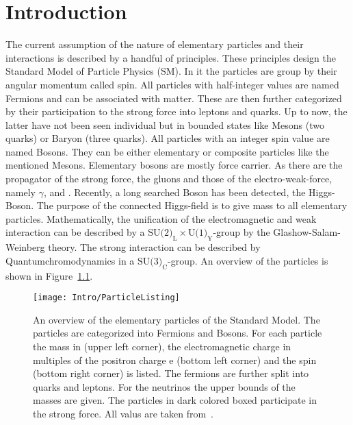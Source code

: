 \chapter{Introduction \label{sec:Intro}}

The current assumption of the nature of elementary particles and their interactions is described by a handful of principles. These principles design the Standard Model of Particle Physics (SM). In it the particles are group by their angular momentum called spin. All particles with half-integer values are named Fermions and can be associated with matter. These are then further categorized by their participation to the strong force into leptons and quarks. Up to now, the latter have not been seen individual but in bounded states like Mesons (two quarks) or Baryon (three quarks). All particles with an integer spin value are named Bosons. They can be either elementary or composite particles like the mentioned Mesons. Elementary bosons are mostly force carrier. As there are the propagator of the strong force, the gluons and those of the electro-weak-force, namely $\gamma{}$, \Zz{} and \Wpm{}. Recently, a long searched Boson has been detected, the Higgs-Boson. The purpose of the connected Higgs-field is to give mass to all elementary particles. Mathematically, the unification of the electromagnetic and weak interaction can be described by a $\textrm{SU(2)}_{\textrm{L}} \times \textrm{U(1)}_{\textrm{Y}}$-group by the Glashow-Salam-Weinberg theory. The strong interaction can be described by Quantumchromodynamics in a $\textrm{SU(3)}_{\textrm{C}}$-group. An overview of the particles is shown in Figure~\ref{plot:IntroParticles}.

\begin{figure}[!htb]
  \centering
  \texttt{[image: Intro/ParticleListing]}
  \caption[Overview over the elementary particles]{An overview of the elementary particles of the Standard Model. The particles are categorized into Fermions and Bosons. For each particle the mass in \MeV (upper left corner), the electromagnetic charge in multiples of the positron charge e (bottom left corner) and the spin (bottom right corner) is listed. The fermions are further split into quarks and leptons. For the neutrinos the upper bounds of the masses are given. The particles in dark colored boxed participate in the strong force. All valus are taken from~. \label{plot:IntroParticles} }
\end{figure}

